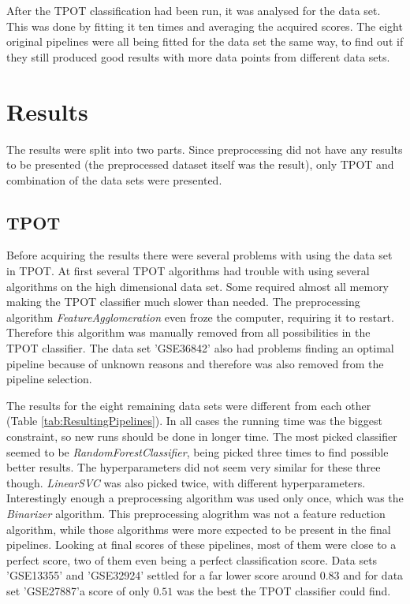\documentclass[10pt,a4paper]{article}
\begin{document}
	After the TPOT classification had been run, it was analysed for the data set. This was done by fitting it ten times and averaging the acquired scores. The eight original pipelines were all being fitted for the data set the same way, to find out if they still produced good results with more data points from different data sets.

	
	\section{Results}
	\label{sec:Results}
	
	The results were split into two parts. Since preprocessing did not have any results to be presented (the preprocessed dataset itself was the result), only TPOT and combination of the data sets were presented.
	
	\subsection{TPOT}
	\label{subsec:ResultsTPOT}

	Before acquiring the results there were several problems with using the data set in TPOT. At first several TPOT algorithms had trouble with using several algorithms on the high dimensional data set. Some required almost all memory making the TPOT classifier much slower than needed. The preprocessing algorithm \textit{FeatureAgglomeration} even froze the computer, requiring it to restart. Therefore this algorithm was manually removed from all possibilities in the TPOT classifier. The data set 'GSE36842' also had problems finding an optimal pipeline because of unknown reasons and therefore was also removed from the pipeline selection.
	
	The results for the eight remaining data sets were different from each other (Table \ref{tab:ResultingPipelines}). In all cases the running time was the biggest constraint, so new runs should be done in longer time. The most picked classifier seemed to be \textit{RandomForestClassifier}, being picked three times to find possible better results. The hyperparameters did not seem very similar for these three though. \textit{LinearSVC} was also picked twice, with different hyperparameters. Interestingly enough a preprocessing algorithm was used only once, which was the \textit{Binarizer} algorithm. This preprocessing alogrithm was not a feature reduction algorithm, while those algorithms were more expected to be present in the final pipelines. Looking at final scores of these pipelines, most of them were close to a perfect score, two of them even being a perfect classification score. Data sets 'GSE13355' and 'GSE32924' settled for a far lower score around $0.83$ and for data set 'GSE27887'a score of only $0.51$ was the best the TPOT classifier could find.
\end{document}
